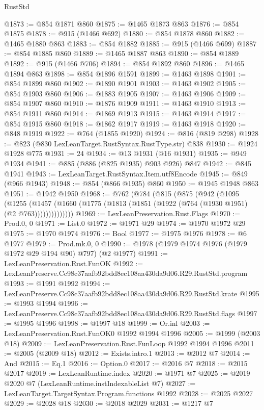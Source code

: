 \begin{lexlean}{RustStd}
\begin{coremodule}
@1873 := @854 @1871 @860
@1875 := @1465 @1873 @863
@1876 := @854 @1875
@1878 := @915 (@1466 @692)
@1880 := @854 @1878 @860
@1882 := @1465 @1880 @863
@1883 := @854 @1882
@1885 := @915 (@1466 @699)
@1887 := @854 @1885 @860
@1889 := @1465 @1887 @863
@1890 := @854 @1889
@1892 := @915 (@1466 @706)
@1894 := @854 @1892 @860
@1896 := @1465 @1894 @863
@1898 := @854 @1896 @1591
@1899 := @1463 @1898
@1901 := @854 @1899 @860
@1902 := @1890 @1901
@1903 := @1463 @1902
@1905 := @854 @1903 @860
@1906 := @1883 @1905
@1907 := @1463 @1906
@1909 := @854 @1907 @860
@1910 := @1876 @1909
@1911 := @1463 @1910
@1913 := @854 @1911 @860
@1914 := @1869 @1913
@1915 := @1463 @1914
@1917 := @854 @1915 @860
@1918 := @1862 @1917
@1919 := @1463 @1918
@1920 := @848 @1919
@1922 := @764 (@1855 @1920)
@1924 := @816 (@819 @298)
@1928 := @823 (@830 LexLeanTarget.RustSyntax.RustType.str) @838
@1930 := @1924 @1928 @775
@1931 := 24
@1934 := @13 @1931 (@16 @1931)
@1935 := @949 @1934
@1941 := @885 (@886 (@825 @1935) @903 @926) @847
@1942 := @845 @1941
@1943 := LexLeanTarget.RustSyntax.Item.utf8Encode
@1945 := @849 (@966 @1943)
@1948 := @854 (@866 @1935) @860
@1950 := @1945 @1948 @863
@1951 := @1942 @1950
@1968 := @762
    (@784
      (@815
        (@875
          (@942
            (@1095
              (@1255
                (@1457 (@1660 (@1775 (@1813 (@1851 (@1922 (@764 (@1930 @1951) (@2 @763))))))))))))))
@1969 := LexLeanPreservation.Rust.Flags
@1970 := Prod.{0, 0}
@1971 := List.{0}
@1972 := @1971 @29
@1974 := @1970 @1972 @29
@1975 := @1970 @1974
@1976 := Bool
@1977 := @1975 @1976
@1978 := @6 @1977
@1979 := Prod.mk.{0, 0}
@1990 := @1978 (@1979 @1974 @1976 (@1979 @1972 @29 @194 @90) @797) (@2 @1977)
@1991 := LexLeanPreservation.Rust.FunOK
@1992 := LexLeanPreserve.Cc98c37aafb92bdd8ec108aa430da9d06.R29.RustStd.program
@1993 := @1991 @1992
@1994 := LexLeanPreserve.Cc98c37aafb92bdd8ec108aa430da9d06.R29.RustStd.krate
@1995 := @1993 @1994
@1996 := LexLeanPreserve.Cc98c37aafb92bdd8ec108aa430da9d06.R29.RustStd.flags
@1997 := @1995 @1996
@1998 := @1997 @18
@1999 := Or.inl
@2003 := LexLeanPreservation.Rust.FunOK0 @1992 @1994 @1996
@2005 := @1999 (@2003 @18)
@2009 := LexLeanPreservation.Rust.FunLoop @1992 @1994 @1996
@2011 := @2005 (@2009 @18)
@2012 := Exists.intro.{1}
@2013 := @2012 @7
@2014 := And
@2015 := Eq.{1}
@2016 := Option.{0}
@2017 := @2016 @7
@2018 := @2015 @2017
@2019 := LexLeanRuntime.index
@2020 := @1971 @7
@2025 := @2019 @2020 @7 (LexLeanRuntime.instIndexableList @7)
@2027 := LexLeanTarget.TargetSyntax.Program.functions @1992
@2028 := @2025 @2027
@2029 := @2028 @18
@2030 := @2018 @2029
@2031 := @1217 @7

\end{coremodule}
\end{lexlean}
